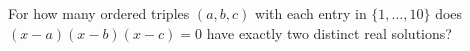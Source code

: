 For how many ordered triples $(a,b,c)$ with each entry in $\{1,\ldots,10\}$ does $(x-a)(x-b)(x-c)=0$ have exactly two distinct real solutions?
